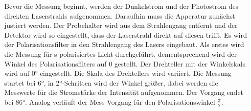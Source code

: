Bevor die Messung beginnt, werden der Dunkelstrom und der Photostrom des direkten Laserstrahls aufgenommen.
Daraufhin muss die Apperatur zunächst justiert werden. Der Probehalter wird aus dem Strahlengang entfernt und der Detektor wird 
so eingestellt, dass der Laserstrahl direkt auf diesen trifft. Es wird der Polarisationsfilter
in den Strahlengang des Lasers eingebaut. Als erstes wird die Messung für s-polarisiertes Licht durchgeführt, dementsprechend 
wird der Winkel des Polarisationsfilters auf 0 gestellt. Der Drehteller mit der Winkelskala wird auf $\ang{0}$ eingestellt.
Die Skala des Drehtellers wird variiert. Die Messung startet bei $\ang{6}$, in $\ang{2}$-Schritten wird der Winkel größer, dabei
werden die Messwerte für die Stromstärke der Intensität aufgenommen. Der Vorgang endet bei $\ang{86}$. Analog verläuft 
der Mess-Vorgang für den Polarisationswinkel $\frac{\pi}{2}$.
